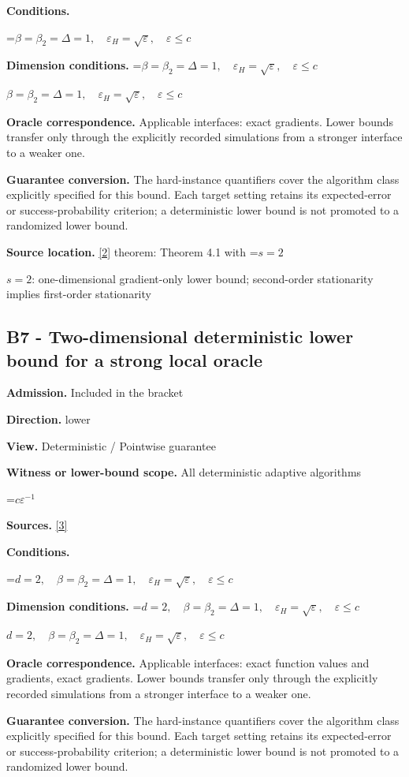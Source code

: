 \documentclass[10pt,a4paper]{article}
\newcommand{\AtlasMath}[1]{\par\begingroup\centering\setbox0=\hbox{$\displaystyle #1$}\ifdim\wd0>1.4\linewidth\typeout{ATLAS WIDE FORMULA: \the\wd0}\fi\ifdim\wd0>\linewidth\resizebox{\linewidth}{!}{\box0}\else\box0\fi\par\endgroup}
\newcommand{\AtlasInlineMath}[1]{\begingroup\setbox0=\hbox{$#1$}\ifdim\wd0>.4\linewidth\endgroup\AtlasMath{#1}\else\endgroup$#1$\fi}
\begin{document}
\textbf{Conditions.} 
\AtlasMath{\beta=\beta_2=\Delta=1,\quad\varepsilon_H=\sqrt\varepsilon,\quad\varepsilon\le c}


\textbf{Dimension conditions.} \AtlasInlineMath{\beta=\beta_2=\Delta=1,\quad\varepsilon_H=\sqrt\varepsilon,\quad\varepsilon\le c}

\textbf{Oracle correspondence.} Applicable interfaces: exact gradients. Lower bounds transfer only through the explicitly recorded simulations from a stronger interface to a weaker one.

\textbf{Guarantee conversion.} The hard-instance quantifiers cover the algorithm class explicitly specified for this bound. Each target setting retains its expected-error or success-probability criterion; a deterministic lower bound is not promoted to a randomized lower bound.

\textbf{Source location.} \href{https://arxiv.org/abs/2610.16295}{[2]} theorem: Theorem 4.1 with \AtlasInlineMath{s=2}: one-dimensional gradient-only lower bound; second-order stationarity implies first-order stationarity

\subsection{B7 - Two-dimensional deterministic lower bound for a strong local oracle}
\textbf{Admission.} Included in the bracket

\textbf{Direction.} lower

\textbf{View.} Deterministic / Pointwise guarantee

\textbf{Witness or lower-bound scope.} All deterministic adaptive algorithms

\AtlasMath{c\varepsilon^{-1}}
\textbf{Sources.} \href{https://proceedings.mlr.press/v235/kontogiannis24a.html}{[3]}

\textbf{Conditions.} 
\AtlasMath{d=2,\quad\beta=\beta_2=\Delta=1,\quad\varepsilon_H=\sqrt\varepsilon,\quad\varepsilon\le c}


\textbf{Dimension conditions.} \AtlasInlineMath{d=2,\quad\beta=\beta_2=\Delta=1,\quad\varepsilon_H=\sqrt\varepsilon,\quad\varepsilon\le c}

\textbf{Oracle correspondence.} Applicable interfaces: exact function values and gradients, exact gradients. Lower bounds transfer only through the explicitly recorded simulations from a stronger interface to a weaker one.

\textbf{Guarantee conversion.} The hard-instance quantifiers cover the algorithm class explicitly specified for this bound. Each target setting retains its expected-error or success-probability criterion; a deterministic lower bound is not promoted to a randomized lower bound.
\end{document}
